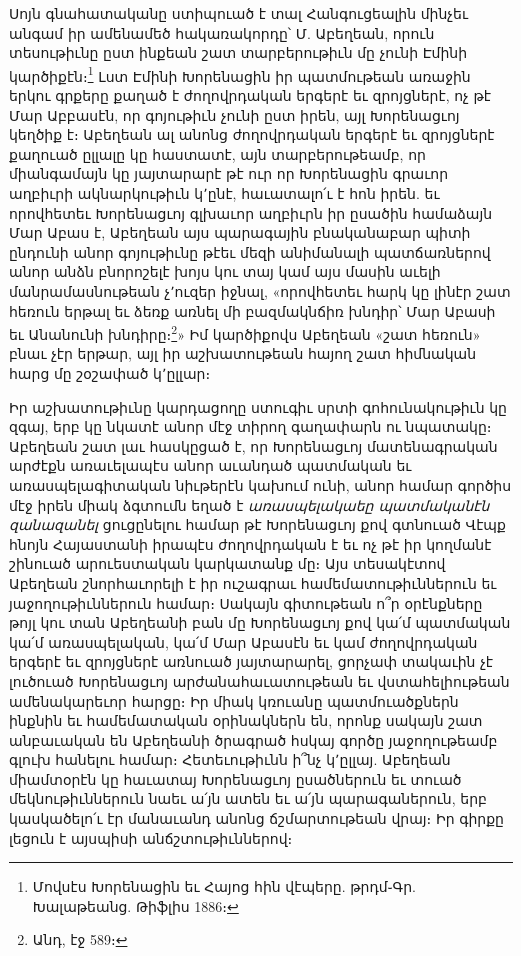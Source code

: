 \documentclass{article}
\begin{document}
{Սոյն գնահատականը ստիպուած է տալ Հանգուցեալին մինչեւ անգամ իր ամենամեծ հակառակորդը՝ Մ. Աբեղեան, որուն տեսութիւնը ըստ ինքեան շատ տարբերութիւն մը չունի Էմինի կարծիքէն։\footnote{Մովսէս Խորենացին եւ Հայոց հին վէպերը. թրդմ֊Գր. Խալաթեանց. Թիֆլիս 1886։} Լստ Էմինի Խորենացին իր պատմութեան առաջին երկու գրքերը քաղած է ժողովրդական երգերէ եւ զրոյցներէ, ոչ թէ Մար Աբբասէն, որ գոյութիւն չունի ըստ իրեն, այլ Խորենացւոյ կեղծիք է։ Աբեղեան ալ անոնց ժողովրդական երգերէ եւ զրոյցներէ քաղուած ըլլալը կը հաստատէ, այն տարբերութեամբ, որ միանգամայն կը յայտարարէ թէ ուր որ Խորենացին գրաւոր աղբիւրի ակնարկութիւն կ՚ընէ, հաւատալո՛ւ է հոն իրեն. եւ որովհետեւ Խորենացւոյ գլխաւոր աղբիւրն իր ըսածին համաձայն Մար Աբաս է, Աբեղեան այս պարագային բնականաբար պիտի ընդունի անոր գոյութիւնը թէեւ մեզի անիմանալի պատճառներով անոր անձն բնորոշելէ խոյս կու տայ կամ այս մասին աւելի մանրամասնութեան չ՚ուզեր իջնալ, «որովհետեւ հարկ կը լինէր շատ հեռուն երթալ եւ ձեռք առնել մի բազմակնճիռ խնդիր՝ Մար Աբասի եւ Անանունի խնդիրը։\footnote{Անդ, էջ 589։}» Իմ կարծիքովս Աբեղեան «շատ հեռուն» բնաւ չէր երթար, այլ իր աշխատութեան հայող շատ հիմնական հարց մը շօշափած կ՚ըլլար։

Իր աշխատութիւնը կարդացողը ստուգիւ սրտի գոհունակութիւն կը զգայ, երբ կը նկատէ անոր մէջ տիրող գաղափարն ու նպատակը։ Աբեղեան շատ լաւ հասկըցած է, որ Խորենացւոյ մատենագրական արժէքն առաւելապէս անոր աւանդած պատմական եւ առասպելագիտական նիւթերէն կախում ունի, անոր համար գործիս մէջ իրեն միակ ձգտումն եղած է \emph{առասպելակաեը պատմականէն զանազանել} ցուցընելու համար թէ Խորենացւոյ քով գտնուած Վէպք հնոյն Հայաստանի իրապէս ժողովրդական է եւ ոչ թէ իր կողմանէ շինուած արուեստական կարկատանք մը։ Այս տեսակէտով Աբեղեան շնորհաւորելի է իր ուշագրաւ համեմատութիւններուն եւ յաջողութիւններուն համար։ Սակայն գիտութեան ո՞ր օրէնքները թոյլ կու տան Աբեղեանի բան մը Խորենացւոյ քով կա՛մ պատմական կա՛մ առասպելական, կա՛մ Մար Աբասէն եւ կամ ժողովրդական երգերէ եւ զրոյցներէ առնուած յայտարարել, ցորչափ տակաւին չէ լուծուած Խորենացւոյ արժանահաւատութեան եւ վստահելիութեան ամենակարեւոր հարցը։ Իր միակ կռուանը պատմուածքներն ինքնին եւ համեմատական օրինակներն են, որոնք սակայն շատ անբաւական են Աբեղեանի ծրագրած հսկայ գործը յաջողութեամբ գլուխ հանելու համար։ Հետեւութիւնն ի՞նչ կ՚ըլլայ. Աբեղեան միամտօրէն կը հաւատայ Խորենացւոյ ըսածներուն եւ տուած մեկնութիւններուն նաեւ ա՛յն ատեն եւ ա՛յն պարագաներուն, երբ կասկածելո՛ւ էր մանաւանդ անոնց ճշմարտութեան վրայ։ Իր գիրքը լեցուն է այսպիսի անճշտութիւններով։

}
\end{document}
